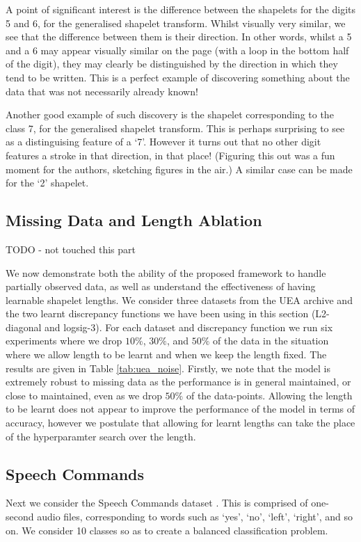 \documentclass{article}
\theoremstyle{plain}
\theoremstyle{definition}
\begin{document}
A point of significant interest is the difference between the shapelets for the digits 5 and 6, for the generalised shapelet transform. Whilst visually very similar, we see that the difference between them is their direction. In other words, whilst a 5 and a 6 may appear visually similar on the page (with a loop in the bottom half of the digit), they may clearly be distinguished by the direction in which they tend to be written. This is a perfect example of discovering something about the data that was not necessarily already known!

Another good example of such discovery is the shapelet corresponding to the class 7, for the generalised shapelet transform. This is perhaps surprising to see as a distinguising feature of a `7'. However it turns out that no other digit features a stroke in that direction, in that place! (Figuring this out was a fun moment for the authors, sketching figures in the air.) A similar case can be made for the `2' shapelet.

\subsection{Missing Data and Length Ablation} \label{sec:missing_and_length}
TODO - not touched this part

We now demonstrate both the ability of the proposed framework to handle partially observed data, as well as understand the effectiveness of having learnable shapelet lengths. We consider three datasets from the UEA archive and the two learnt discrepancy functions we have been using in this section (L2-diagonal and logsig-3). For each dataset and discrepancy function we run six experiments where we drop $10\%$, $30\%$, and $50\%$ of the data in the situation where we allow length to be learnt and when we keep the length fixed. The results are given in Table \ref{tab:uea_noise}. Firstly, we note that the model is extremely robust to missing data as the performance is in general maintained, or close to maintained, even as we drop $50\%$ of the data-points. Allowing the length to be learnt does not appear to improve the performance of the model in terms of accuracy, however we postulate that allowing for learnt lengths can take the place of the hyperparamter search over the length.
\begin{table}[ht]
    \caption{}
    \label{tab:uea_noise}
    \centering
    
\end{table}


\subsection{Speech Commands}
Next we consider the Speech Commands dataset \cite{warden2018speech}. This is comprised of one-second audio files, corresponding to words such as `yes', `no', `left', `right', and so on. We consider 10 classes so as to create a balanced classification problem.
\end{document}
